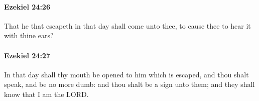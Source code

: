 		\paragraph{Ezekiel 24:26} %
			\label{EZEKIEL-24-26}

			That he that escapeth in that day shall come unto thee, to cause thee to hear it with thine ears?


		\paragraph{Ezekiel 24:27} %
			\label{EZEKIEL-24-27}

			In that day shall thy mouth be opened to him which is escaped, and thou shalt speak, and be no more dumb: and thou shalt be a sign unto them; and they shall know that I am the LORD.

